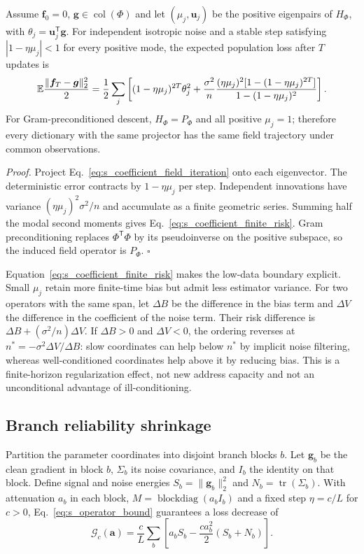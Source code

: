 \begin{proposition}
Assume $\bm f_0=0$, $\bm g\in\operatorname{col}(\Phi)$ and let
$(\mu_j,\bm u_j)$ be the positive eigenpairs of $H_\Phi$, with
$\theta_j=\bm u_j^{\mathsf T}\bm g$. For independent isotropic noise and a stable step satisfying
$|1-\eta\mu_j|<1$ for every positive mode, the expected population loss
after $T$ updates is
\begin{equation}
\mathbb{E}\frac{\lVert\bm f_T-\bm g\rVert_2^2}{2}
=\frac12\sum_j\left[
(1-\eta\mu_j)^{2T}\theta_j^2
+\frac{\sigma^2}{n}
\frac{(\eta\mu_j)^2[1-(1-\eta\mu_j)^{2T}]}
{1-(1-\eta\mu_j)^2}
\right].
\label{eq:s_coefficient_finite_risk}
\end{equation}
For Gram-preconditioned descent, $H_\Phi=P_\Phi$ and all positive $\mu_j=1$;
therefore every dictionary with the same projector has the same field
trajectory under common observations.
\end{proposition}

\noindent\emph{Proof.}
Project Eq.~\ref{eq:s_coefficient_field_iteration} onto each eigenvector. The
deterministic error contracts by $1-\eta\mu_j$ per step. Independent innovations
have variance $(\eta\mu_j)^2\sigma^2/n$ and accumulate as a finite geometric
series. Summing half the modal second moments gives
Eq.~\ref{eq:s_coefficient_finite_risk}. Gram preconditioning replaces
$\Phi^{\mathsf T}\Phi$ by its pseudoinverse on the positive subspace, so the induced
field operator is $P_\Phi$. \hfill$\square$

Equation~\ref{eq:s_coefficient_finite_risk} makes the low-data boundary
explicit. Small $\mu_j$ retain more finite-time bias but admit less estimator
variance. For two operators with the same span, let $\Delta B$ be the difference in
the bias term and $\Delta V$ the difference in the coefficient of the
noise term. Their risk difference is $\Delta B+(\sigma^2/n)\Delta V$. If $\Delta B>0$ and $\Delta V<0$, the
ordering reverses at
$n^*=-\sigma^2\Delta V/\Delta B$: slow coordinates can help below $n^*$ by
implicit noise filtering, whereas well-conditioned coordinates help above it
by reducing bias. This is a finite-horizon regularization effect, not new
address capacity and not an unconditional advantage of ill-conditioning.

\subsection{Branch reliability shrinkage}

Partition the parameter coordinates into disjoint branch blocks $b$. Let
$\bm g_b$ be the clean gradient in block $b$, $\Sigma_b$ its noise
covariance, and $I_b$ the identity on that block. Define signal and noise
energies $S_b=\lVert\bm g_b\rVert_2^2$ and
$N_b=\operatorname{tr}(\Sigma_b)$. With attenuation $a_b$ in each block,
$M=\operatorname{blockdiag}(a_bI_b)$ and a fixed step $\eta=c/L$ for $c>0$,
Eq.~\ref{eq:s_operator_bound} guarantees a loss decrease of
\begin{equation}
\mathcal G_c(\bm a)=\frac{c}{L}\sum_b
\left[a_bS_b-\frac{c a_b^2}{2}(S_b+N_b)\right].
\label{eq:s_branch_guarantee}
\end{equation}

